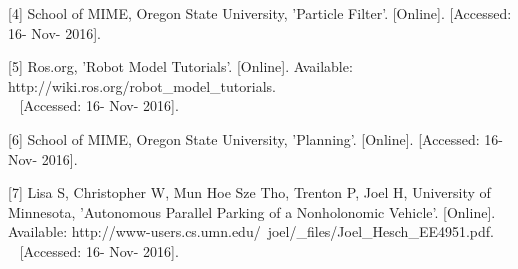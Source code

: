 \documentclass[compsoc,draftclsnofoot,onecolumn,10pt]{IEEEtran}
\begin{document}
[4] School of MIME, Oregon State University, 'Particle Filter'. [Online].
[Accessed: 16- Nov- 2016].\par

[5] Ros.org, 'Robot Model Tutorials'. [Online].
Available: http://wiki.ros.org/robot_model_tutorials.\\~
[Accessed: 16- Nov- 2016].\par

[6] School of MIME, Oregon State University, 'Planning'. [Online].
[Accessed: 16- Nov- 2016].\par

[7] Lisa S, Christopher W, Mun Hoe Sze Tho, Trenton P, Joel H, University 
of Minnesota, 'Autonomous Parallel Parking of a Nonholonomic Vehicle'. [Online]. 
Available: http://www-users.cs.umn.edu/~joel/_files/Joel_Hesch_EE4951.pdf.\\~ 
[Accessed: 16- Nov- 2016].\par
\end{document}
